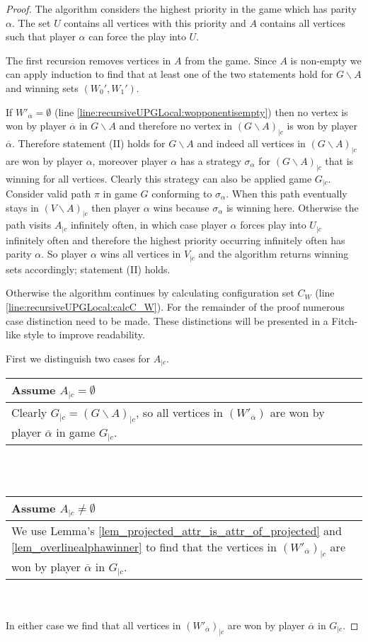 \begin{theorem}
\begin{proof}
		The algorithm considers the highest priority in the game which has parity $\alpha$. The set $U$ contains all vertices with this priority and $A$ contains all vertices such that player $\alpha$ can force the play into $U$.
		
		The first recursion removes vertices in $A$ from the game. Since $A$ is non-empty we can apply induction to find that at least one of the two statements hold for $G\backslash A$ and winning sets $(W_0',W_1')$.
		
		If $W'_{\overline{\alpha}} = \emptyset$ (line \ref{line:recursiveUPGLocal:wopponentisempty}) then no vertex is won by player $\overline{\alpha}$ in $G\backslash A$ and therefore no vertex in $(G\backslash A)_{|c}$ is won by player $\overline{\alpha}$. Therefore statement (II) holds for $G\backslash A$ and indeed all vertices in $(G\backslash A)_{|c}$ are won by player $\alpha$, moreover player $\alpha$ has a strategy $\sigma_\alpha$ for $(G\backslash A)_{|c}$ that is winning for all vertices. Clearly this strategy can also be applied game $G_{|c}$. Consider valid path $\pi$ in game $G$ conforming to $\sigma_\alpha$. When this path eventually stays in $(V \backslash A)_{|c}$ then player $\alpha$ wins because $\sigma_\alpha$ is winning here. Otherwise the path visits $A_{|c}$ infinitely often, in which case player $\alpha$ forces play into $U_{|c}$ infinitely often and therefore the highest priority occurring infinitely often has parity $\alpha$. So player $\alpha$ wins all vertices in $V_{|c}$ and the algorithm returns winning sets accordingly; statement (II) holds.
		
		Otherwise the algorithm continues by calculating configuration set $C_W$ (line \ref{line:recursiveUPGLocal:calcC_W}). For the remainder of the proof numerous case distinction need to be made. These distinctions will be presented in a Fitch-like style to improve readability.
		
		First we distinguish two cases for $A_{|c}$.
		
		\begin{tabular}{|p{14.2cm}}
			Assume $A_{|c} = \emptyset$\\
			\hline
			Clearly $G_{|c} = (G\backslash A)_{|c}$, so all vertices in $(W'_{\overline{\alpha}})$ are won by player $\overline{\alpha}$ in game $G_{|c}$.
		\end{tabular}\\\\
		\begin{tabular}{|p{14.2cm}}
			Assume $A_{|c} \neq \emptyset$\\
			\hline
			We use Lemma's \ref{lem_projected_attr_is_attr_of_projected} and \ref{lem_overlinealphawinner} to find that the vertices in $(W'_{\overline{\alpha}})_{|c}$ are won by player $\overline{\alpha}$ in $G_{|c}$.
		\end{tabular}\\\\
		In either case we find that all vertices in $(W'_{\overline{\alpha}})_{|c}$ are won by player $\overline{\alpha}$ in $G_{|c}$.
		

\end{proof}
\end{theorem}
